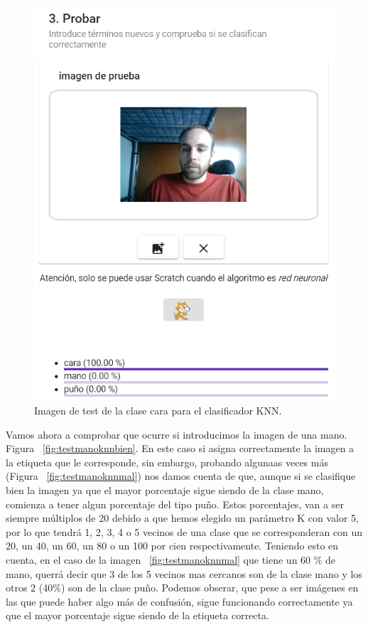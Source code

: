 \documentclass[a4paper, 12pt]{book}
\begin{document}
\begin{figure}
	\centering
	\includegraphics[width=12cm, keepaspectratio]{img/testcaraknn}
	\caption{Imagen de test de la clase cara para el clasificador KNN.}			
	\label{fig:testcaraknn}
\end{figure}

Vamos ahora a comprobar que ocurre si introducimos la imagen de una mano. Figura ~\ref{fig:testmanoknnbien}. En este caso si asigna correctamente la imagen a la etiqueta que le corresponde, sin embargo, probando algunaas veces más (Figura ~\ref{fig:testmanoknnmal}) nos damos cuenta de que, aunque si se clasifique bien la imagen ya que el mayor porcentaje sigue siendo de la clase mano, comienza a tener algun porcentaje del tipo puño. Estos porcentajes, van a ser siempre múltiplos de 20 debido a que hemos elegido un parámetro K con valor 5, por lo que tendrá 1, 2, 3, 4 o 5 vecinos de una clase que se corresponderan con un 20, un 40, un 60, un 80 o un 100 por cien respectivamente. Teniendo esto en cuenta, en el caso de la imagen  ~\ref{fig:testmanoknnmal} que tiene un 60 \% de mano, querrá decir que 3 de los 5 vecinos mas cercanos son de la clase mano y los otros 2 (40\%) son de la clase puño. Podemos obserar, que pese a ser imágenes en las que puede haber algo más de confusión, sigue funcionando correctamente ya que el mayor porcentaje sigue siendo de la etiqueta correcta.
\end{document}
